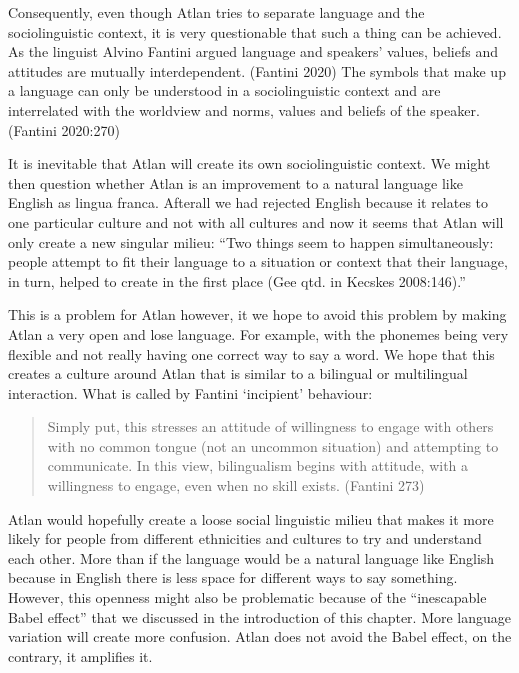 Consequently, even though Atlan tries to separate language and the sociolinguistic context, it is very questionable that such a thing can be achieved. As the linguist Alvino Fantini argued language and speakers' values, beliefs and attitudes are mutually interdependent. (Fantini 2020) The symbols that make up a language can only be understood in a sociolinguistic context and are interrelated with the worldview and norms, values and beliefs of the speaker. (Fantini 2020:270)		

It is inevitable that Atlan will create its own sociolinguistic context. We might then question whether Atlan is an improvement to a natural language like English as lingua franca. Afterall we had rejected English because it relates to one particular culture and not with all cultures and now it seems that Atlan will only create a new singular milieu: “Two things seem to happen simultaneously: people attempt to fit their language to a situation or context that their language, in turn, helped to create in the first place (Gee qtd. in Kecskes 2008:146).”  				 

This is a problem for Atlan however, it we hope to avoid this problem by making Atlan a very open and lose language. For example, with the phonemes being very flexible and not really having one correct way to say a word. We hope that this creates a culture around Atlan that is similar to a bilingual or multilingual interaction. What is called by Fantini ‘incipient’ behaviour: 

\begin{quote} 

Simply put, this stresses an attitude of willingness to 	engage with others with no common tongue (not an		uncommon situation) and attempting to communicate. In 	this view, bilingualism begins with attitude, with a 		willingness to engage, even when no skill exists.	(Fantini 273)  

\end{quote} 

Atlan would hopefully create a loose social linguistic milieu that makes it more likely for people from different ethnicities and cultures to try and understand each other. More than if the language would be a natural language like English because in English there is less space for different ways to say something. However, this openness might also be problematic because of the “inescapable Babel effect” that we discussed in the introduction of this chapter. More language variation will create more confusion. Atlan does not avoid the Babel effect, on the contrary, it amplifies it.

